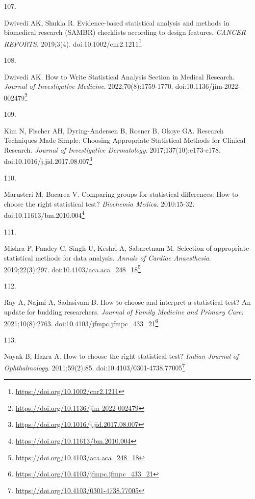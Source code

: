 \documentclass[
]{book}
\newlength{\cslhangindent}
\newlength{\csllabelwidth}
\newlength{\cslentryspacingunit} %
\newenvironment{CSLReferences}[2] %
 {%
  \setlength{\parindent}{0pt}
  \ifodd #1
  \let\oldpar\par
  \def\par{\hangindent=\cslhangindent\oldpar}
  \fi
  \setlength{\parskip}{#2\cslentryspacingunit}
 }%
 {}
\newcommand{\CSLLeftMargin}[1]{\parbox[t]{\csllabelwidth}{#1}}
\newcommand{\CSLRightInline}[1]{\parbox[t]{\linewidth - \csllabelwidth}{#1}\break}
\renewcommand{\href}[2]{#2\footnote{\url{#1}}}
\begin{document}
\begin{CSLReferences}{0}{0}
\leavevmode{}%
\CSLLeftMargin{107. }%
\CSLRightInline{Dwivedi AK, Shukla R. Evidence{-}based statistical analysis and methods in biomedical research (SAMBR) checklists according to design features. \emph{CANCER REPORTS}. 2019;3(4). doi:\href{https://doi.org/10.1002/cnr2.1211}{10.1002/cnr2.1211}}

\leavevmode{}%
\CSLLeftMargin{108. }%
\CSLRightInline{Dwivedi AK. How to Write Statistical Analysis Section in Medical Research. \emph{Journal of Investigative Medicine}. 2022;70(8):1759-1770. doi:\href{https://doi.org/10.1136/jim-2022-002479}{10.1136/jim-2022-002479}}

\leavevmode{}%
\CSLLeftMargin{109. }%
\CSLRightInline{Kim N, Fischer AH, Dyring-Andersen B, Rosner B, Okoye GA. Research Techniques Made Simple: Choosing Appropriate Statistical Methods for Clinical Research. \emph{Journal of Investigative Dermatology}. 2017;137(10):e173-e178. doi:\href{https://doi.org/10.1016/j.jid.2017.08.007}{10.1016/j.jid.2017.08.007}}

\leavevmode{}%
\CSLLeftMargin{110. }%
\CSLRightInline{Marusteri M, Bacarea V. Comparing groups for statistical differences: How to choose the right statistical test? \emph{Biochemia Medica}. 2010:15-32. doi:\href{https://doi.org/10.11613/bm.2010.004}{10.11613/bm.2010.004}}

\leavevmode{}%
\CSLLeftMargin{111. }%
\CSLRightInline{Mishra P, Pandey C, Singh U, Keshri A, Sabaretnam M. Selection of appropriate statistical methods for data analysis. \emph{Annals of Cardiac Anaesthesia}. 2019;22(3):297. doi:\href{https://doi.org/10.4103/aca.aca_248_18}{10.4103/aca.aca\_248\_18}}

\leavevmode{}%
\CSLLeftMargin{112. }%
\CSLRightInline{Ray A, Najmi A, Sadasivam B. How to choose and interpret a statistical test? An update for budding researchers. \emph{Journal of Family Medicine and Primary Care}. 2021;10(8):2763. doi:\href{https://doi.org/10.4103/jfmpc.jfmpc_433_21}{10.4103/jfmpc.jfmpc\_433\_21}}

\leavevmode{}%
\CSLLeftMargin{113. }%
\CSLRightInline{Nayak B, Hazra A. How to choose the right statistical test? \emph{Indian Journal of Ophthalmology}. 2011;59(2):85. doi:\href{https://doi.org/10.4103/0301-4738.77005}{10.4103/0301-4738.77005}}


\end{CSLReferences}
\end{document}
